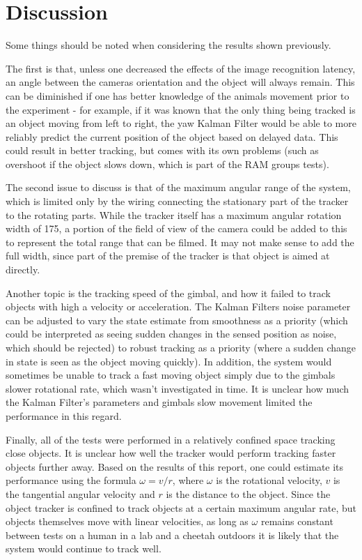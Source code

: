 \chapter{Discussion}\label{chap:discussion}

Some things should be noted when considering the results shown previously.

The first is that, unless one decreased the effects of the image recognition latency, an angle between the cameras orientation and the object will always remain. This can be diminished if one has better knowledge of the animals movement prior to the experiment - for example, if it was known that the only thing being tracked is an object moving from left to right, the yaw Kalman Filter would be able to more reliably predict the current position of the object based on delayed data. This could result in better tracking, but comes with its own problems (such as overshoot if the object slows down, which is part of the RAM groups tests).

The second issue to discuss is that of the maximum angular range of the system, which is limited only by the wiring connecting the stationary part of the tracker to the rotating parts. While the tracker itself has a maximum angular rotation width of 175\textdegree, a portion of the field of view of the camera could be added to this to represent the total range that can be filmed. It may not make sense to add the full width, since part of the premise of the tracker is that object is aimed at directly.

Another topic is the tracking speed of the gimbal, and how it failed to track objects with high a velocity or acceleration. The Kalman Filters noise parameter can be adjusted to vary the state estimate from smoothness as a priority (which could be interpreted as seeing sudden changes in the sensed position as noise, which should be rejected) to robust tracking as a priority (where a sudden change in state is seen as the object moving quickly). In addition, the system would sometimes be unable to track a fast moving object simply due to the gimbals slower rotational rate, which wasn't investigated in time. It is unclear how much the Kalman Filter's parameters and gimbals slow movement limited the performance in this regard.

Finally, all of the tests were performed in a relatively confined space tracking close objects. It is unclear how well the tracker would perform tracking faster objects further away. Based on the results of this report, one could estimate its performance using the formula $\omega = v/r$, where $\omega$ is the rotational velocity, $v$ is the tangential angular velocity and $r$ is the distance to the object. Since the object tracker is confined to track objects at a certain maximum angular rate, but objects themselves move with linear velocities, as long as $\omega$ remains constant between tests on a human in a lab and a cheetah outdoors it is likely that the system would continue to track well.
